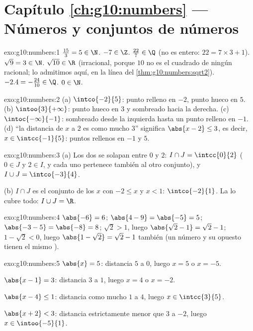 \section*{Capítulo \ref{ch:g10:numbers} --- Números y conjuntos de números}

\begin{solution}{exo:g10:numbers:1}
$\frac{15}{3} = 5 \in \N$. \quad $-7 \in \Z$. \quad
$\frac{22}{7} \in \Q$ (no es entero: $22 = 7 \times 3 + 1$).
\quad $\sqrt 9 = 3 \in \N$. \quad $\sqrt{10} \in \R$ (irracional, porque
$10$ no es el cuadrado de ningún racional; lo admitimos aquí, en la línea
del \cref{thm:g10:numbers:sqrt2}). \quad $-2.4 = -\frac{24}{10} \in \Q$.
\quad $0 \in \N$.
\end{solution}

\begin{solution}{exo:g10:numbers:2}
(a) $\intco{-2}{5}$: punto relleno en $-2$, punto hueco en $5$.
(b) $\intoo{3}{+\infty}$: punto hueco en $3$ y sombreado hacia la derecha.
(c) $\intoc{-\infty}{-1}$: sombreado desde la izquierda hasta un punto
relleno en $-1$.
(d) ``la distancia de $x$ a $2$ es como mucho $3$'' significa
$\abs{x - 2} \leq 3$, es decir, $x \in \intcc{-1}{5}$: puntos rellenos en
$-1$ y $5$.
\end{solution}

\begin{solution}{exo:g10:numbers:3}
(a) Los dos  se solapan entre $0$ y $2$:
$I \cap J = \intcc{0}{2}$ ($0 \in J$ y $2 \in I$, y cada uno pertenece
también al otro conjunto), y $I \cup J = \intco{-3}{4}$.

(b) $I \cap J$ es el conjunto de los $x$ con $-2 \leq x$ y $x < 1$:
$\intco{-2}{1}$. La  lo cubre todo: $I \cup J = \R$.
\end{solution}

\begin{solution}{exo:g10:numbers:4}
$\abs{-6} = 6$; \quad $\abs{4 - 9} = \abs{-5} = 5$; \quad
$\abs{-3 - 5} = \abs{-8} = 8$; \quad
$\sqrt 2 > 1$, luego $\abs{\sqrt2 - 1} = \sqrt2 - 1$; \quad
$1 - \sqrt2 < 0$, luego $\abs{1 - \sqrt2} = \sqrt2 - 1$ también (un
número y su opuesto tienen el mismo ).
\end{solution}

\begin{solution}{exo:g10:numbers:5}
$\abs{x} = 5$: distancia $5$ a $0$, luego $x = 5$ o $x = -5$.

$\abs{x - 1} = 3$: distancia $3$ a $1$, luego $x = 4$ o $x = -2$.

$\abs{x - 4} \leq 1$: distancia como mucho $1$ a $4$, luego
$x \in \intcc{3}{5}$.

$\abs{x + 2} < 3$: distancia estrictamente menor que $3$ a $-2$, luego
$x \in \intoo{-5}{1}$.
\end{solution}

